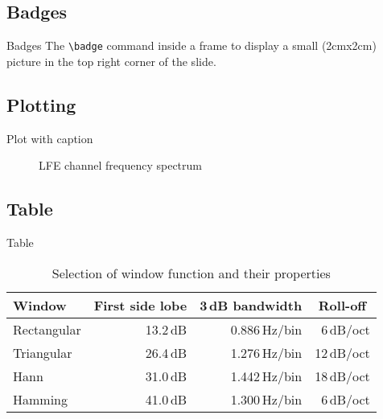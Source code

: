 \documentclass[compress,aspectratio=169]{beamer}
\begin{document}

\subsection{Badges}
\begin{frame}[containsverbatim]{Badges}
    The \verb!\badge! command inside a frame to display a small (2cmx2cm) picture in the top right corner of the slide.

\end{frame}

\subsection{Plotting}
\begin{frame}{Plot with caption}
    \begin{figure}
        \centering
        
        \caption{LFE channel frequency spectrum}
    \end{figure}
\end{frame}


\subsection{Table}
\begin{frame}{Table}
    \begin{table}[]
        \caption{Selection of window function and their properties}
        \begin{tabular}[]{lrrr}
            \toprule
            \textbf{Window}			& \multicolumn{1}{c}{\textbf{First side lobe}}	
            & \multicolumn{1}{c}{\textbf{3\,dB bandwidth}}
            & \multicolumn{1}{c}{\textbf{Roll-off}} \\
            \midrule
            Rectangular				& 13.2\,dB	& 0.886\,Hz/bin	& 6\,dB/oct		\\[0.25em]
            Triangular				& 26.4\,dB	& 1.276\,Hz/bin	& 12\,dB/oct	\\[0.25em]
            Hann					& 31.0\,dB	& 1.442\,Hz/bin	& 18\,dB/oct	\\[0.25em]
            Hamming					& 41.0\,dB	& 1.300\,Hz/bin	& 6\,dB/oct		\\
            \bottomrule
        \end{tabular}
        \label{tab:WindowFunctions}
    \end{table}
\end{frame}
\end{document}
